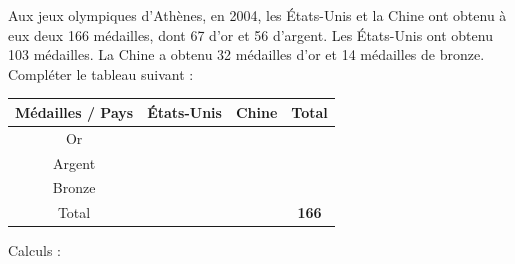 \documentclass[a4paper]{book}
\begin{document}
{    \begin{exercice}
        Aux jeux olympiques d'Athènes, en 2004, les États-Unis et la Chine ont obtenu à eux deux 166 médailles, dont 67 d'or et 56 d'argent. Les États-Unis ont obtenu 103 médailles. La Chine a obtenu 32 médailles d'or et 14 médailles de bronze. Compléter le tableau suivant :

        \begin{center}
            \begin{tabular}{|c|c|c|c|}
                \hline
                Médailles / Pays & États-Unis & Chine & Total \\
                \hline
                Or & & & \\
                \hline
                Argent & & & \\
                \hline
                Bronze & & & \\
                \hline
                Total & & & \textbf{166} \\
                \hline
            \end{tabular}
        \end{center}

        Calculs : 

        \points[40] \\ \points[40] \\ \points[40] \\ \points[40] \\ \points[40] \\ \points[40]
    \end{exercice}  

}
\end{document}
